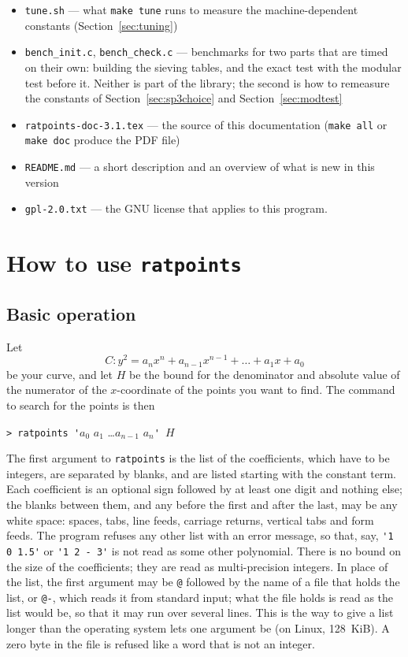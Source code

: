 \documentclass[12pt,a4paper,oneside]{amsart}
\begin{document}
{\begin{itemize}
        \texttt{make testmaxdegree} run
  \item \texttt{tune.sh} --- what \texttt{make tune} runs to measure the
        machine-dependent constants (Section~\ref{sec:tuning})
  \item \texttt{bench\_init.c}, \texttt{bench\_check.c} --- benchmarks for
        two parts that are timed on their own: building the sieving tables,
        and the exact test with the modular test before it.  Neither is
        part of the library; the second is how to remeasure the constants
        of Section~\ref{sec:sp3choice} and Section~\ref{sec:modtest}
  \item \texttt{ratpoints-doc-3.1.tex} --- the source of this documentation
        (\texttt{make all} or \texttt{make doc} produce the PDF file)
  \item \texttt{README.md} --- a short description and an overview of what
        is new in this version
  \item \texttt{gpl-2.0.txt} --- the GNU license that applies to this program.
\end{itemize}%
}


\section{How to use \texttt{ratpoints}}\label{sec:usage}

\subsection{Basic operation}

Let
\[ C : y^2 = a_n x^n + a_{n-1} x^{n-1} + \dots + a_1 x + a_0 \]
be your
curve, and let $H$ be the bound for the denominator and absolute value
of the numerator of the $x$-coordinate of the points you want to find.
The command to search for the points is then

\verb+> ratpoints '+$a_0$ $a_1$ \dots $a_{n-1}$ $a_n$\verb+' +$H$

The first argument to \texttt{ratpoints} is the list of the coefficients,
which have to be integers, are separated by blanks, and are listed
starting with the constant term. Each coefficient is an optional sign
followed by at least one digit and nothing else; the blanks between them,
and any before the first and after the last, may be any white space:
spaces, tabs, line feeds, carriage returns, vertical tabs and form feeds.
The program refuses any other list with an error message, so that, say,
\verb+'1 0 1.5'+ or \verb+'1 2 - 3'+ is not read as some other
polynomial. There is no bound on the size of the
coefficients; they are read as multi-precision integers.
In place of the list, the first argument may be \verb+@+ followed by the
name of a file that holds the list, or \verb+@-+, which reads it from
standard input; what the file holds is read as the list would be, so that
it may run over several lines. This is the way to give a list longer than
the operating system lets one argument be (on Linux, 128~KiB). A zero
byte in the file is refused like a word that is not an integer.
\end{document}
